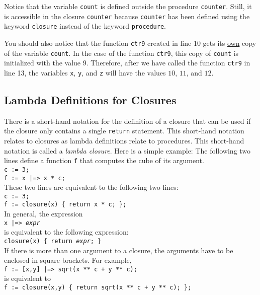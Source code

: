 Notice that the variable \texttt{count} is defined outside the procedure
\texttt{counter}.  Still, it is accessible in the closure \texttt{counter} because \texttt{counter}
has been defined using the keyword \texttt{closure} instead of the keyword \texttt{procedure}.

You should also notice that the function \texttt{ctr9} created in line 10 gets its
\underline{own} copy of the variable \texttt{count}.  In the case of the function
\texttt{ctr9}, this copy of \texttt{count} is initialized with the value 9.  Therefore, after
we have called the function \texttt{ctr9} in line 13, the variables \texttt{x}, \texttt{y}, and
\texttt{z} will have the values $10$, $11$, and $12$. 

\subsection{Lambda Definitions for Closures}
There is a short-hand notation for the definition of a closure that can be used if the closure only
contains a single \texttt{return} statement. This short-hand notation relates to closures as lambda definitions relate to
procedures.  This short-hand notation is called a \emph{lambda closure}.  Here is a simple example:
The following two lines define a function \texttt{f} that computes the cube of its argument.
\\[0.2cm]
\hspace*{1.3cm} \texttt{c := 3;}            \\
\hspace*{1.3cm} \texttt{f := x |=> x * c;}
\\[0.2cm]
These two lines are equivalent to the following two lines:
\\[0.2cm]
\hspace*{1.3cm} \texttt{c := 3;}            \\
\hspace*{1.3cm} \texttt{f := closure(x) \{ return x * c; \};}
\\[0.2cm]
In general, the expression
\\[0.2cm]
\hspace*{1.3cm}
\texttt{x |=> \textsl{expr}}
\\[0.2cm]
is equivalent to the following expression:
\\[0.2cm]
\hspace*{1.3cm}
\texttt{closure(x) \{ return \textsl{expr}; \}}
\\[0.2cm]
If there is more than one argument to a closure, the arguments have to be enclosed in square
brackets.  For example, 
\\[0.2cm]
\hspace*{1.3cm}
\texttt{f := [x,y] |=> sqrt(x ** c + y ** c);}
\\[0.2cm]
is equivalent to
\\[0.2cm]
\hspace*{1.3cm}
\texttt{f := closure(x,y) \{ return sqrt(x ** c + y ** c); \};}

